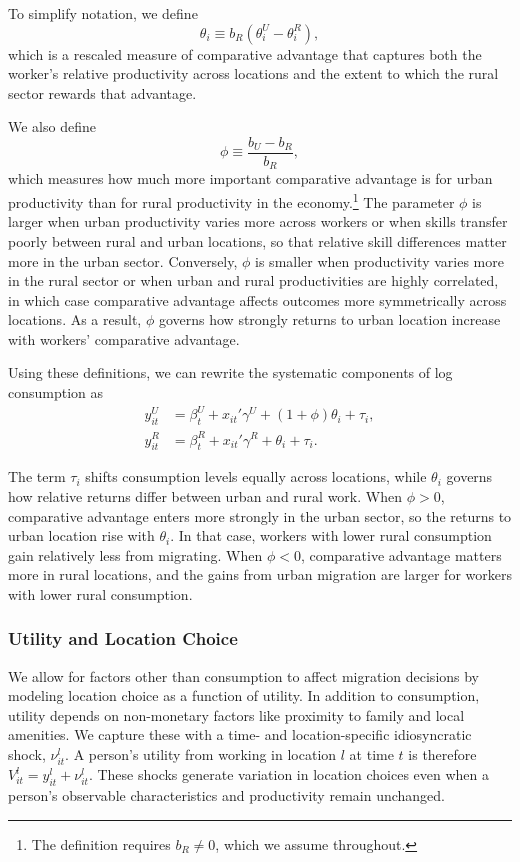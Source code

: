 To simplify notation, we define
\[
\theta_i \equiv b_R(\theta_i^U-\theta_i^R),
\]
which is a rescaled measure of comparative advantage that captures both the worker's relative productivity across locations and the extent to which the rural sector rewards that advantage.

We also define
\[
\phi \equiv \frac{b_U-b_R}{b_R},
\]
which measures how much more important comparative advantage is for urban productivity than for rural productivity in the economy.\footnote{The definition requires $b_R\neq 0$, which we assume throughout.}
The parameter $\phi$ is larger when urban productivity varies more across workers or when skills transfer poorly between rural and urban locations, so that relative skill differences matter more in the urban sector.
Conversely, $\phi$ is smaller when productivity varies more in the rural sector or when urban and rural productivities are highly correlated, in which case comparative advantage affects outcomes more symmetrically across locations.
As a result, $\phi$ governs how strongly returns to urban location increase with workers' comparative advantage.

Using these definitions, we can rewrite the systematic components of log consumption as
\begin{align}
y_{it}^{U} &= \beta_t^U + x_{it}'\gamma^U + (1+\phi)\theta_i + \tau_i, \label{eq:ysys_U_phi}\\
y_{it}^{R} &= \beta_t^R + x_{it}'\gamma^R + \theta_i + \tau_i. \label{eq:ysys_R_phi}
\end{align}

The term $\tau_i$ shifts consumption levels equally across locations, while $\theta_i$ governs how relative returns differ between urban and rural work.
When $\phi>0$, comparative advantage enters more strongly in the urban sector, so the returns to urban location rise with $\theta_i$.
In that case, workers with lower rural consumption gain relatively less from migrating.
When $\phi<0$, comparative advantage matters more in rural locations, and the gains from urban migration are larger for workers with lower rural consumption.

\subsubsection{Utility and Location Choice}

We allow for factors other than consumption to affect migration decisions by modeling location choice as a function of utility. 
In addition to consumption, utility depends on non-monetary factors like proximity to family and local amenities.
We capture these with a time- and location-specific idiosyncratic shock, $\nu_{it}^{l}$. 
A person's utility from working in location $l$ at time $t$ is therefore \(V_{it}^{l} = y_{it}^l + \nu_{it}^{l}\). 
These shocks generate variation in location choices even when a person's observable characteristics and productivity remain unchanged.


